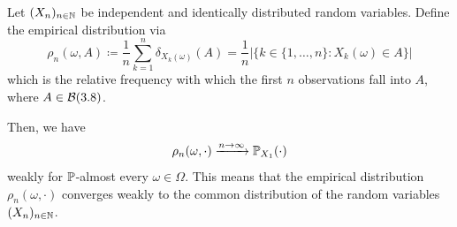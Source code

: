 \begin{theorem}\label{thm:glivenko-cantelli}
Let $(X_n)_{n \in \mathbb{N}}$ be independent and identically distributed random variables.
Define the empirical distribution via
\[
\rho_n(\omega, A) 
\coloneq
\frac{1}{n}\sum_{k=1}^n \delta_{X_k(\omega)}(A)
=
\frac{1}{n} |\{k \in \{1,\ldots,n\} : X_k(\omega) \in A\}|
\]
which is the relative frequency with which the first $n$ observations fall into $A$, where $A \in \mathcal{B}(3.8)$.

Then, we have
\[
\rho_n(\omega, \cdot)
\xrightarrow{n \to \infty}
\mathbb{P}_{X_1}(\cdot)
\]
weakly for $\mathbb{P}$-almost every $\omega \in \Omega$.
This means that the empirical distribution $\rho_n(\omega,\cdot)$ converges weakly to the common distribution of the random variables $(X_n)_{n \in \mathbb{N}}$.
\end{theorem}


